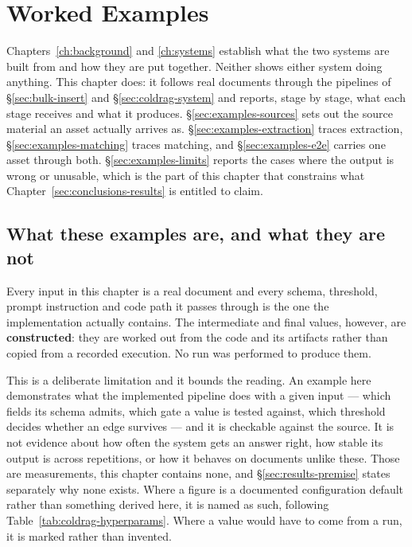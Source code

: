 \chapter{Worked Examples}
\label{ch:examples}

Chapters~\ref{ch:background} and \ref{ch:systems} establish what the two systems are built from and how they are put together. Neither shows either system doing anything. This chapter does: it follows real documents through the pipelines of \S\ref{sec:bulk-insert} and \S\ref{sec:coldrag-system} and reports, stage by stage, what each stage receives and what it produces. \S\ref{sec:examples-sources} sets out the source material an asset actually arrives as. \S\ref{sec:examples-extraction} traces extraction, \S\ref{sec:examples-matching} traces matching, and \S\ref{sec:examples-e2e} carries one asset through both. \S\ref{sec:examples-limits} reports the cases where the output is wrong or unusable, which is the part of this chapter that constrains what Chapter~\ref{sec:conclusions-results} is entitled to claim.

\section{What these examples are, and what they are not}
\label{sec:examples-premise}

Every input in this chapter is a real document and every schema, threshold, prompt instruction and code path it passes through is the one the implementation actually contains. The intermediate and final values, however, are \textbf{constructed}: they are worked out from the code and its artifacts rather than copied from a recorded execution. No run was performed to produce them.

This is a deliberate limitation and it bounds the reading. An example here demonstrates what the implemented pipeline does with a given input --- which fields its schema admits, which gate a value is tested against, which threshold decides whether an edge survives --- and it is checkable against the source. It is not evidence about how often the system gets an answer right, how stable its output is across repetitions, or how it behaves on documents unlike these. Those are measurements, this chapter contains none, and \S\ref{sec:results-premise} states separately why none exists. Where a figure is a documented configuration default rather than something derived here, it is named as such, following Table~\ref{tab:coldrag-hyperparams}. Where a value would have to come from a run, it is marked rather than invented.

